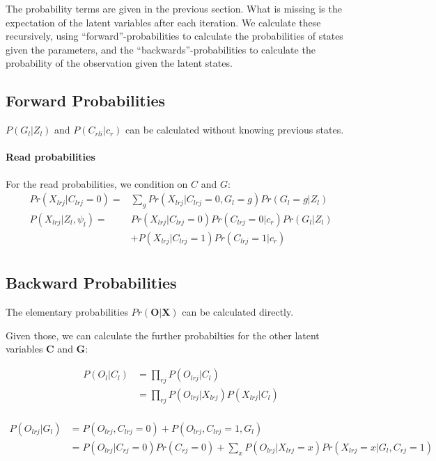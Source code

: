 \documentclass[10pt,a4paper]{article}
\newcommand{\BFG}{\mathbf{G}}
\newcommand{\BFO}{\mathbf{O}}
\newcommand{\BFC}{\mathbf{C}}
\newcommand{\BFX}{\mathbf{X}}
\begin{document}
The probability terms are given in the previous section. What is missing is the expectation of the latent variables after each iteration. We calculate these recursively, using ``forward''-probabilities to calculate the probabilities of states given the parameters, and the ``backwards''-probabilities to calculate the probability of the observation given the latent states.



\subsection*{Forward Probabilities}
$P(G_l |Z_l )$ and $P(C_{rli} | c_r)$ can be calculated without knowing previous states.

\paragraph{Read probabilities}
For the read probabilities, we condition on $C$ and $G$:
\begin{align*}
	Pr(X_{lrj} | C_{lrj}=0) =& \sum_g Pr(X_{lrj} | C_{lrj}=0, G_l=g)Pr(G_l=g | Z_l) \\
    P(X_{lrj} | Z_l, \psi_l) =& Pr(X_{lrj} | C_{lrj}=0) Pr( C_{lrj}=0 | c_r) Pr(G_l|Z_l)\\ &+  P(X_{lrj} | C_{lrj}=1) Pr(C_{lrj}=1 | c_r) \\
\end{align*}

\subsection*{Backward Probabilities}
The elementary probabilities $Pr(\BFO|\BFX)$ can be calculated directly.

Given those, we can calculate the further probabilties for the other latent variables $\BFC$ and $\BFG$:

\begin{align*}
P(O_{l} | C_l) &= \prod_{rj} P(O_{lrj} | C_l)\\
&= \prod_{rj} P(O_{lrj} | X_{lrj}) P(X_{lrj} | C_l)\\
\end{align*}

\begin{align*}
	P(O_{lrj} | G_l) &=  P(O_{lrj} , C_{lrj}=0) + P(O_{lrj} , C_{lrj}=1, G_l)\\
	&= P(O_{lrj}| C_{rj}=0)Pr(C_{rj}=0) + \sum_x P(O_{lrj}| X_{lrj}=x) Pr(X_{lrj}=x | G_l, C_{rj}=1)\\\\
\end{align*}
\end{document}
